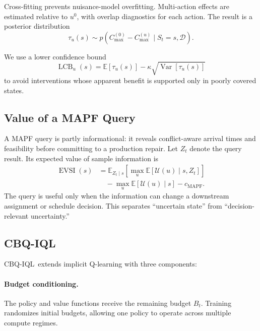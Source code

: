 \documentclass[11pt,a4paper]{article}
\newcommand{\algo}{CBQ-IQL}
\newcommand{\cmax}{C_{\max}}
\newcommand{\E}{\mathbb{E}}
\newcommand{\Var}{\operatorname{Var}}
\begin{document}
Cross-fitting prevents nuisance-model overfitting. Multi-action effects are
estimated relative to \(u^0\), with overlap diagnostics for each action.
The result is a posterior distribution
\begin{equation}
    \tau_u(s)
    \sim
    p\!\left(
    \cmax^{(0)}-\cmax^{(u)}
    \mid S_t=s,\mathcal{D}
    \right).
    \label{eq:effectposterior}
\end{equation}

We use a lower confidence bound
\begin{equation}
    \operatorname{LCB}_u(s)
    =
    \E[\tau_u(s)]
    -\kappa\sqrt{\Var[\tau_u(s)]}
    \label{eq:lcb}
\end{equation}
to avoid interventions whose apparent benefit is supported only in poorly
covered states.

\subsection{Value of a MAPF Query}

A MAPF query is partly informational: it reveals conflict-aware arrival times
and feasibility before committing to a production repair. Let \(Z_t\) denote
the query result. Its expected value of sample information is
\begin{align}
    \operatorname{EVSI}(s)
    &=
    \E_{Z_t\mid s}
    \left[
        \max_{u}
        \E[\mathcal{U}(u)\mid s,Z_t]
    \right]
    \nonumber\\
    &\quad-
    \max_{u}
    \E[\mathcal{U}(u)\mid s]
    -c_{\mathrm{MAPF}}.
    \label{eq:evsi}
\end{align}
The query is useful only when the information can change a downstream
assignment or schedule decision. This separates ``uncertain state'' from
``decision-relevant uncertainty.''

\subsection{\algo}

\algo\ extends implicit Q-learning with three components:

\paragraph{Budget conditioning.}
The policy and value functions receive the remaining budget \(B_t\). Training
randomizes initial budgets, allowing one policy to operate across multiple
compute regimes.
\end{document}
